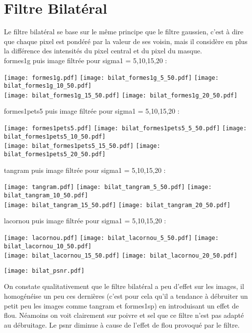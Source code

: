 \documentclass[12pt]{article}
\numberwithin{equation}{section}
\begin{document}
\section{Filtre Bilatéral}
Le filtre bilatéral se base sur le même principe que le filtre gaussien, c'est à dire que chaque pixel est pondéré par la valeur de ses voisin, mais il considère en plus la différence des intensités du pixel central et du pixel du masque.\\ 
formes1g puis image filtrée pour sigma1 = 5,10,15,20 :\\
\begin{center}
\texttt{[image: formes1g.pdf]}
\texttt{[image: bilat\_formes1g\_5\_50.pdf]}
\texttt{[image: bilat\_formes1g\_10\_50.pdf]}\\
\texttt{[image: bilat\_formes1g\_15\_50.pdf]}
\texttt{[image: bilat\_formes1g\_20\_50.pdf]}
\end{center}
formes1pets5 puis image filtrée pour sigma1 = 5,10,15,20 :\\
\begin{center}
\texttt{[image: formes1pets5.pdf]}
\texttt{[image: bilat\_formes1pets5\_5\_50.pdf]}
\texttt{[image: bilat\_formes1pets5\_10\_50.pdf]}\\
\texttt{[image: bilat\_formes1pets5\_15\_50.pdf]}
\texttt{[image: bilat\_formes1pets5\_20\_50.pdf]}
\end{center}
tangram puis image filtrée pour sigma1 = 5,10,15,20 :\\
\begin{center}
\texttt{[image: tangram.pdf]}
\texttt{[image: bilat\_tangram\_5\_50.pdf]}
\texttt{[image: bilat\_tangram\_10\_50.pdf]}\\
\texttt{[image: bilat\_tangram\_15\_50.pdf]}
\texttt{[image: bilat\_tangram\_20\_50.pdf]}
\end{center}
lacornou puis image filtrée pour sigma1 = 5,10,15,20 :\\
\begin{center}
\texttt{[image: lacornou.pdf]}
\texttt{[image: bilat\_lacornou\_5\_50.pdf]}
\texttt{[image: bilat\_lacornou\_10\_50.pdf]}\\
\texttt{[image: bilat\_lacornou\_15\_50.pdf]}
\texttt{[image: bilat\_lacornou\_20\_50.pdf]}
\end{center}

\begin{center}
\texttt{[image: bilat\_psnr.pdf]}\\
\end{center}

On constate qualitativement que le filtre bilatéral a peu d'effet sur les images, il homogénéise un peu ces dernières (c'est pour cela qu'il a tendance à débruiter un petit peu les images comme tangram et formes1sp) en introduisant un effet de flou. Néamoins on voit clairement sur poivre et sel que ce filtre n'est pas adapté au débruitage. Le psnr diminue à cause de l'effet de flou provoqué par le filtre.
\end{document}
